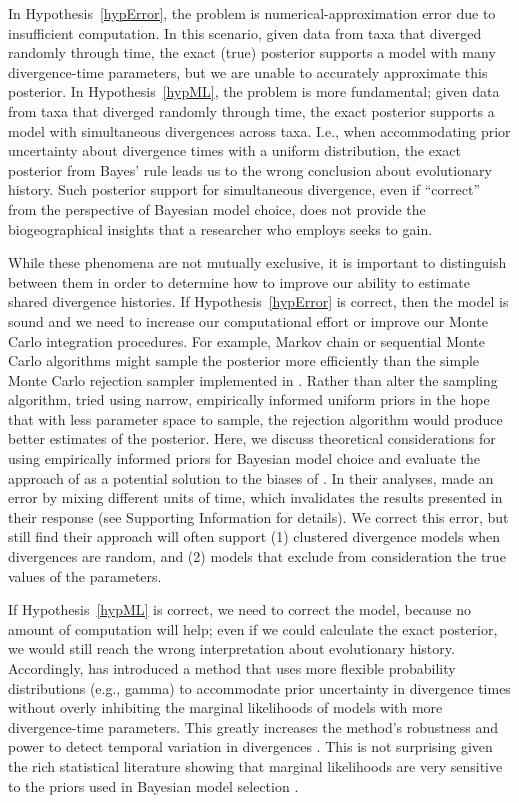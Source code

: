 In Hypothesis~\ref{hypError}, the problem is numerical-approximation error due
to insufficient computation.
In this scenario, given data from taxa that diverged randomly through time, the
exact (true) posterior supports a model with many divergence-time parameters,
but we are unable to accurately approximate this posterior.
In Hypothesis~\ref{hypML}, the problem is more fundamental; given data from
taxa that diverged randomly through time, the exact posterior supports a model
with simultaneous divergences across taxa.
I.e., when accommodating prior uncertainty about divergence times with a
uniform distribution, the exact posterior from Bayes' rule leads us to the
wrong conclusion about evolutionary history.
Such posterior support for simultaneous divergence, even if ``correct'' from
the perspective of Bayesian model choice, does not provide the biogeographical
insights that a researcher who employs \msb seeks to gain.

While these phenomena are not mutually exclusive, it is important to
distinguish between them in order to determine how to improve our ability to
estimate shared divergence histories.
If Hypothesis~\ref{hypError} is correct, then the model is sound and we need to
increase our computational effort or improve our Monte Carlo integration
procedures.
For example, Markov chain or sequential Monte Carlo algorithms might sample the
posterior more efficiently than the simple Monte Carlo rejection sampler
implemented in \msb.
Rather than alter the sampling algorithm, \citet{Hickerson2013} tried using
narrow, empirically informed uniform priors in the hope that with less
parameter space to sample, the rejection algorithm would produce better
estimates of the posterior.
Here, we discuss theoretical considerations for using empirically informed
priors for Bayesian model choice and evaluate the approach of
\citet{Hickerson2013} as a potential solution to the biases of \msb.
In their analyses, \citet{Hickerson2013} made an error by mixing different
units of time, which invalidates the results presented in their response (see
Supporting Information for details).
We correct this error, but still find their approach will often support
(1) clustered divergence models when divergences are random, and
(2) models that exclude from consideration the true values of the
parameters.

If Hypothesis~\ref{hypML} is correct, we need to correct the model, because no
amount of computation will help; even if we could calculate the exact
posterior, we would still reach the wrong interpretation about evolutionary
history.
Accordingly, \citet{Oaks2014dpp} has introduced a method that uses more
flexible probability distributions (e.g., gamma) to accommodate prior
uncertainty in divergence times without overly inhibiting the marginal
likelihoods of models with more divergence-time parameters.
This greatly increases the method's robustness and power to detect temporal
variation in divergences \citep{Oaks2014dpp}.
This is not surprising given the rich statistical literature showing that
marginal likelihoods are very sensitive to the priors used in Bayesian model
selection
\citep[e.g.,][]{Jeffreys1939,Lindley1957}.

